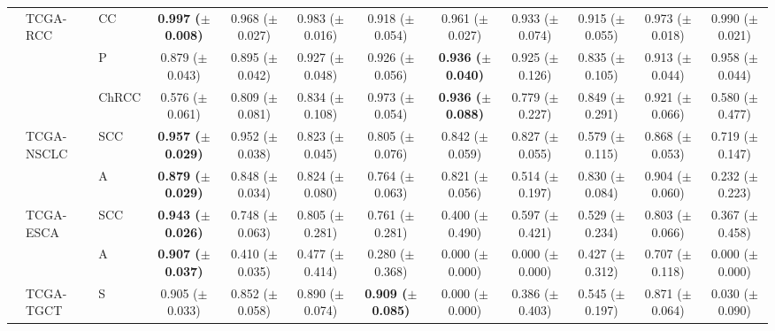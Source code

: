 \documentclass[10pt,twocolumn,letterpaper]{article}
\begin{document}
\begin{table}[h]
{{\begin{tabular}{lllcc|ccccc|cc}
          & TCGA-RCC   & CC  & \textbf{0.997 ($\pm$0.008)}  & 0.968 ($\pm$0.027)           & 0.983 ($\pm$0.016)        & 0.918 ($\pm$0.054)          & 0.961 ($\pm$0.027)          & 0.933 ($\pm$0.074)          & 0.915 ($\pm$0.055)          & 0.973 ($\pm$0.018)        & 0.990 ($\pm$0.021)        \\
          &            & P& 0.879 ($\pm$0.043)           & 0.895 ($\pm$0.042)           & 0.927 ($\pm$0.048)        & 0.926 ($\pm$0.056)          & \textbf{0.936 ($\pm$0.040)} & 0.925 ($\pm$0.126)          & 0.835 ($\pm$0.105)          & 0.913 ($\pm$0.044)        & 0.958 ($\pm$0.044)        \\
          &            & ChRCC & 0.576 ($\pm$0.061)           & 0.809 ($\pm$0.081)           & 0.834 ($\pm$0.108)        & 0.973 ($\pm$0.054)          & \textbf{0.936 ($\pm$0.088)} & 0.779 ($\pm$0.227)          & 0.849 ($\pm$0.291)          & 0.921 ($\pm$0.066)        & 0.580 ($\pm$0.477)        \\
          & TCGA-NSCLC & SCC          & \textbf{0.957 ($\pm$0.029)}  & 0.952 ($\pm$0.038)           & 0.823 ($\pm$0.045)        & 0.805 ($\pm$0.076)          & 0.842 ($\pm$0.059)          & 0.827 ($\pm$0.055)          & 0.579 ($\pm$0.115)          & 0.868 ($\pm$0.053)        & 0.719 ($\pm$0.147)        \\
          &            & A                   & \textbf{0.879 ($\pm$0.029)}  & 0.848 ($\pm$0.034)           & 0.824 ($\pm$0.080)        & 0.764 ($\pm$0.063)          & 0.821 ($\pm$0.056)          & 0.514 ($\pm$0.197)          & 0.830 ($\pm$0.084)          & 0.904 ($\pm$0.060)        & 0.232 ($\pm$0.223)        \\
          & TCGA-ESCA  & SCC          & \textbf{0.943 ($\pm$0.026)}  & 0.748 ($\pm$0.063)           & 0.805 ($\pm$0.281)        & 0.761 ($\pm$0.281)          & 0.400 ($\pm$0.490)          & 0.597 ($\pm$0.421)          & 0.529 ($\pm$0.234)          & 0.803 ($\pm$0.066)        & 0.367 ($\pm$0.458)        \\
          &            & A                   & \textbf{0.907 ($\pm$0.037)}  & 0.410 ($\pm$0.035)           & 0.477 ($\pm$0.414)        & 0.280 ($\pm$0.368)          & 0.000 ($\pm$0.000)          & 0.000 ($\pm$0.000)          & 0.427 ($\pm$0.312)          & 0.707 ($\pm$0.118)        & 0.000 ($\pm$0.000)        \\
          & TCGA-TGCT  & S & 0.905 ($\pm$0.033)           & 0.852 ($\pm$0.058)           & 0.890 ($\pm$0.074)        & \textbf{0.909 ($\pm$0.085)} & 0.000 ($\pm$0.000)          & 0.386 ($\pm$0.403)          & 0.545 ($\pm$0.197)          & 0.871 ($\pm$0.064)        & 0.030 ($\pm$0.090)        \\

\end{tabular}}}
\end{table}
\end{document}
